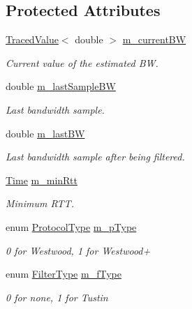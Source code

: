 \subsection*{Protected Attributes}
\begin{DoxyCompactItemize}
\item 
\hyperlink{classns3_1_1TracedValue}{Traced\+Value}$<$ double $>$ \hyperlink{classns3_1_1TcpWestwood_a6cd16270e13f4ba8f1da9d5aa3a6d90b}{m\+\_\+current\+BW}
\begin{DoxyCompactList}\small\item\em Current value of the estimated BW. \end{DoxyCompactList}\item 
double \hyperlink{classns3_1_1TcpWestwood_ac7b94cf0c7c62cb706293a236055447d}{m\+\_\+last\+Sample\+BW}
\begin{DoxyCompactList}\small\item\em Last bandwidth sample. \end{DoxyCompactList}\item 
double \hyperlink{classns3_1_1TcpWestwood_aadc6e09132619de3079c7bfbbc7df5ef}{m\+\_\+last\+BW}
\begin{DoxyCompactList}\small\item\em Last bandwidth sample after being filtered. \end{DoxyCompactList}\item 
\hyperlink{classns3_1_1Time}{Time} \hyperlink{classns3_1_1TcpWestwood_aa6eadb9dc36f52a850aa06ffea8c2dda}{m\+\_\+min\+Rtt}
\begin{DoxyCompactList}\small\item\em Minimum R\+TT. \end{DoxyCompactList}\item 
enum \hyperlink{classns3_1_1TcpWestwood_aa511ec7338686eb4d01c636f84e3f4d2}{Protocol\+Type} \hyperlink{classns3_1_1TcpWestwood_a204ec8fc69424e246a4a9b0be0c0586f}{m\+\_\+p\+Type}
\begin{DoxyCompactList}\small\item\em 0 for Westwood, 1 for Westwood+ \end{DoxyCompactList}\item 
enum \hyperlink{classns3_1_1TcpWestwood_a705750d92431a17a9997ad6fbf2918aa}{Filter\+Type} \hyperlink{classns3_1_1TcpWestwood_a2f18c4bdae2012bc39340c1d919e8495}{m\+\_\+f\+Type}
\begin{DoxyCompactList}\small\item\em 0 for none, 1 for Tustin \end{DoxyCompactList}\item 

\end{DoxyCompactItemize}
